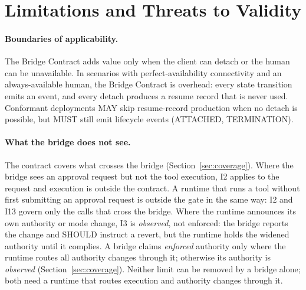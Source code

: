 \section{Limitations and Threats to Validity}
\label{sec:limitations}

\paragraph{Boundaries of applicability.} The Bridge Contract adds value
only when the client can detach or the human can be unavailable. In
scenarios with perfect-availability connectivity and an always-available
human, the Bridge Contract is overhead: every state transition emits an
event, and every detach produces a resume record that is
never used. Conformant deployments MAY skip resume-record production when
no detach is possible, but MUST still emit lifecycle events
(ATTACHED, TERMINATION).

\paragraph{What the bridge does not see.} The contract covers what
crosses the bridge (Section~\ref{sec:coverage}). Where the bridge sees
an approval request but not the tool execution, I2 applies to the
request and execution is outside the contract. A runtime that runs a
tool without first submitting an approval request is outside the gate in
the same way: I2 and I13 govern only the calls that cross the bridge.
Where the runtime
announces its own authority or mode change, I3 is \emph{observed}, not
enforced: the bridge reports the change and SHOULD instruct a revert,
but the runtime holds the widened authority until it complies. A bridge
claims \emph{enforced} authority only where the runtime routes all
authority changes through it; otherwise its authority is
\emph{observed} (Section~\ref{sec:coverage}). Neither
limit can be removed by a bridge alone; both need a runtime that routes
execution and authority changes through it.

